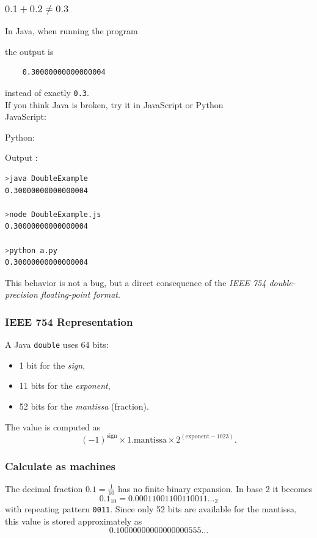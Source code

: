 \documentclass{article}
\begin{document}
\subsubsection{$0.1 + 0.2 \ne 0.3$}
In Java, when running the program

the output is
\begin{verbatim}
	0.30000000000000004
\end{verbatim}
instead of exactly \texttt{0.3}. \\

If you think Java is broken, try it in JavaScript or Python\\
JavaScript:

Python:

Output :
\begin{lstlisting}[language=bash]
>java DoubleExample
0.30000000000000004

>node DoubleExample.js
0.30000000000000004

>python a.py
0.30000000000000004	
\end{lstlisting}

This behavior is not a bug, but a direct consequence of the \emph{IEEE 754 double-precision floating-point format}.

\subsubsection{IEEE 754 Representation}
A Java \texttt{double} uses 64 bits:
\begin{itemize}
	\item 1 bit for the \emph{sign},
	\item 11 bits for the \emph{exponent},
	\item 52 bits for the \emph{mantissa} (fraction).
\end{itemize}

The value is computed as
\[
(-1)^{\text{sign}} \times 1.\text{mantissa} \times 2^{(\text{exponent} - 1023)}.
\]

\subsubsection{Calculate as machines}
The decimal fraction $0.1 = \tfrac{1}{10}$ has no finite binary expansion.
In base 2 it becomes
\[
0.1_{10} = 0.00011001100110011\ldots_2
\]
with repeating pattern \texttt{0011}. Since only 52 bits are available for
the mantissa, this value is stored approximately as
\[
0.10000000000000000555\ldots
\]
\end{document}
